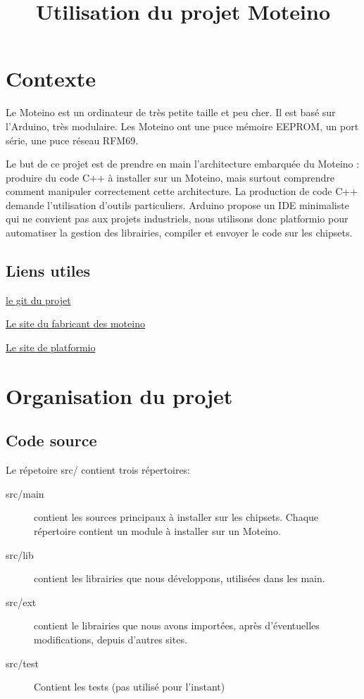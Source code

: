 \documentclass[a4paper]{report}
\title{Utilisation du projet Moteino}
\begin{document}
\dominitoc
\tableofcontents

\chapter{Contexte}

Le Moteino est un ordinateur de très petite taille et peu cher. Il est basé sur l'Arduino, très modulaire. Les Moteino ont une puce mémoire EEPROM, un port série, une puce réseau RFM69.

Le but de ce projet est de prendre en main l'architecture embarquée du Moteino : produire du code C++ à installer sur un Moteino, mais surtout comprendre comment manipuler correctement cette architecture.
La production de code C++ demande l'utilisation d'outils particuliers. Arduino propose un IDE minimaliste qui ne convient pas aux projets industriels, nous utilisons donc platformio pour automatiser la gestion des librairies, compiler et envoyer le code sur les chipsets.

\section{Liens utiles}

\href{https://github.com/glelouet/Moteino}{le git du projet}

\href{https://lowpowerlab.com/guide/moteino/}{Le site du fabricant des moteino}

\href{http://platformio.org/}{Le site de platformio}

\chapter{Organisation du projet}
\minitoc

\section{Code source}

Le répetoire src/ contient trois répertoires:
\begin{description}
\item[src/main] contient les sources principaux à installer sur les chipsets. Chaque répertoire contient un module à installer sur un Moteino.
\item[src/lib] contient les librairies que nous développons, utilisées dans les main.
\item[src/ext] contient le librairies que nous avons importées, après d'éventuelles modifications, depuis d'autres sites.
\item[src/test] Contient les tests (pas utilisé pour l'instant)
\end{description}
\end{document}
